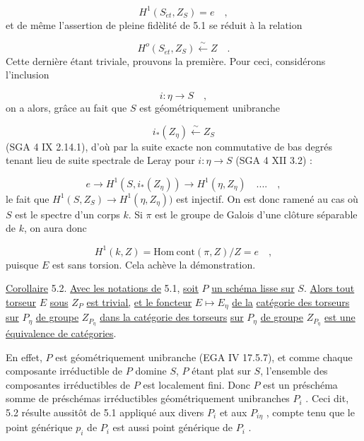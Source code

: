 \begin{equation*}
H^1(S_{\acute{e}t},Z_S) = e \quad ,
\end{equation*}
et de même l'assertion de pleine fidèlité de 5.1 se réduit à la relation

\begin{equation*}
H^o(S_{\acute{e}t},Z_S) \stackrel{\sim}{\longleftarrow} Z \quad .
\end{equation*}
Cette dernière étant triviale, prouvons la première. Pour ceci, considérons l'inclusion

\begin{equation*}
i : \eta \longrightarrow S \quad ,
\end{equation*}
on a alors, grâce au fait que $S$ est géométriquement unibranche

\begin{equation*}
i_*(Z_\eta) \stackrel{\sim}{\longleftarrow} Z_S
\end{equation*}
(SGA 4 IX 2.14.1), d'où par la suite exacte non commutative de bas degrés tenant lieu de suite spectrale de Leray pour $i : \eta \longrightarrow S$ (SGA 4 XII 3.2) :

\begin{equation*}
e \longrightarrow H^1(S,i_*(Z_\eta)) \longrightarrow H^1(\eta,Z_\eta) \quad .... \quad ,
\end{equation*}
le fait que $H^1(S,Z_S) \longrightarrow H^1(\eta,Z_\eta))$ est injectif. On est donc ramené au cas où $S$ est le spectre d'un corps $k$. Si $\pi$ est le groupe de Galois d'une clôture séparable de $k$, on aura donc

\begin{equation*}
H^1(k,Z) = \mathrm{Hom}\ \mathrm{cont}(\pi,Z)/Z = e \quad ,
\end{equation*}
puisque $E$ est sans torsion. Cela achève la démonstration.

\underline{Corollaire} 5.2. \underline{Avec les notations de} 5.1, \underline{soit} $P$ \underline{un schéma lisse sur} $S$. \underline{Alors tout torseur} $E$ \underline{sous} $Z_P$ \underline{est trivial,} \underline{et le foncteur} $E \longmapsto E_\eta$ \underline{de la} \underline{catégorie des torseurs sur} $P_\eta$ \underline{de groupe} $Z_{P_\eta}$ \underline{dans la catégorie des torseurs}
\underline{sur} $P_\eta$ \underline{de groupe} $Z_{P_\eta}$ \underline{est une équivalence de catégories}.

En effet, $P$ est géométriquement unibranche (EGA IV 17.5.7), et comme chaque composante irréductible de $P$ domine $S$, $P$ étant plat sur $S$, l'ensemble des composantes irréductibles de $P$ est localement fini. Donc $P$ est un préschéma somme de préschémas irréductibles géométriquement unibranches $P_i$ . Ceci dit, 5.2 résulte aussitôt de 5.1 appliqué aux divers $P_i$ et aux $P_{i\eta}$ , compte tenu que le point générique $p_i$ de $P_i$ est aussi point générique de $P_i$ .


